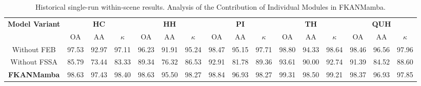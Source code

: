\begin{table}[h]
\caption{Historical single-run within-scene results. Analysis of the Contribution of Individual Modules in FKANMamba.}
\centering
\begin{adjustbox}{max width=\linewidth}
\begin{tabular}{|c|ccc|ccc|ccc|ccc|ccc|}
\hline
\multirow{2}{*}{\textbf{Model Variant}}
& \multicolumn{3}{c|}{\textbf{HC}} & \multicolumn{3}{c|}{\textbf{HH}} & \multicolumn{3}{c|}{\textbf{PI}} & \multicolumn{3}{c|}{\textbf{TH}} & \multicolumn{3}{c|}{\textbf{QUH}} \\
\cline{2-16} 
& OA & AA & $\kappa$ & OA & AA & $\kappa$ & OA & AA & $\kappa$ & OA & AA & $\kappa$ & OA & AA & $\kappa$ \\
\hline
Without FEB
& 97.53 & 92.97 & 97.11 & 96.23 & 91.91 & 95.24 & 98.47 & 95.15 & 97.71 & 98.80 & 94.33 & 98.64 & 98.46 & 96.56 & 97.96 \\
\hline

Without FSSA
& 85.79 & 73.44 & 83.33 & 89.34 & 76.32 & 86.53 & 92.91 & 81.78 & 89.36 & 93.61 & 90.00 & 92.74 & 91.39 & 84.52 & 88.60 \\
\hline

\textbf{FKANMamba}
& 98.63 & 97.43 & 98.40 & 98.63 & 95.50 & 98.27 & 98.84 & 96.93 & 98.27 & 99.31 & 98.50 & 99.21 & 98.37 & 96.93 & 97.85 \\
\hline
\end{tabular}
\end{adjustbox}
\label{tab:feb_fssa}
\end{table}



